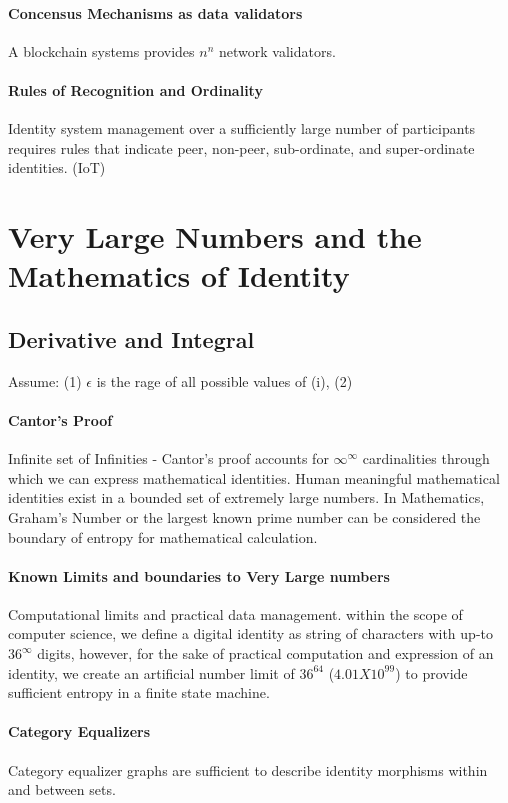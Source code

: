 \documentclass{article}
\begin{document}
			\paragraph{Concensus Mechanisms as data validators}
				A blockchain systems provides $n^n$ network validators.
			\paragraph{Rules of Recognition and Ordinality}
				Identity system management over a sufficiently large number of participants requires rules that indicate peer, non-peer, sub-ordinate, and super-ordinate identities. (IoT)
			
\section{Very Large Numbers and the Mathematics of Identity}
		\subsection{Derivative and Integral}
			Assume: (1) $\epsilon$ is the rage of all possible values of (i), (2) 



		\paragraph{Cantor's Proof} Infinite set of Infinities - Cantor's proof accounts for $\infty^\infty$ cardinalities through which we can express mathematical identities.  Human meaningful mathematical identities exist in a bounded set of extremely large numbers.  In Mathematics, Graham's Number or the largest known prime number can be considered the boundary of entropy for mathematical calculation. 
		\paragraph{Known Limits and boundaries to Very Large numbers} Computational limits and practical data management.  within the scope of computer science, we define a digital identity as string of characters with up-to $36^\infty$ digits, however, for the sake of practical computation and expression of an identity, we create an artificial number limit of $36^{64}$ ($4.01 X10^{99}$) to provide sufficient entropy in a finite state machine.   
		\paragraph{Category Equalizers} Category equalizer graphs are sufficient to describe identity morphisms within and between sets.
\end{document}
